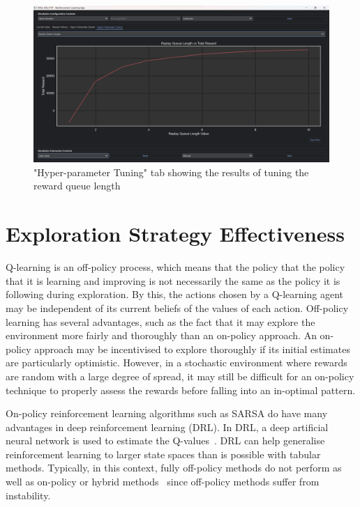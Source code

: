 \documentclass[]{final_report}
\begin{document}
\begin{figure}[H]
  \centering
  
  \includegraphics[trim={0 0 0 6mm},clip,width=\textwidth]{ui-screenshots/hyper-tuning.png}
  
  \caption{\label{fig:screenshot:current-state} "Hyper-parameter Tuning" tab showing the results of tuning the reward queue length}
\end{figure}


\chapter{Exploration Strategy Effectiveness}
\label{chap:exploration-strategy-effectiveness}
Q-learning is an off-policy process, which means that the policy that the policy that it is learning and improving is not necessarily the same as the policy it is following during exploration. By this, the actions chosen by a Q-learning agent may be independent of its current beliefs of the values of each action. Off-policy learning has several advantages, such as the fact that it may explore the environment more fairly and thoroughly than an on-policy approach. An on-policy approach may be incentivised to explore thoroughly if its initial estimates are particularly optimistic. However, in a stochastic environment where rewards are random with a large degree of spread, it may still be difficult for an on-policy technique to properly assess the rewards before falling into an in-optimal pattern.  

On-policy reinforcement learning algorithms such as SARSA do have many advantages in deep reinforcement learning (DRL). In DRL, a deep artificial neural network is used to estimate the Q-values~\cite{deepRLOverview}. DRL can help generalise reinforcement learning to larger state spaces than is possible with tabular methods. Typically, in this context, fully off-policy methods do not perform as well as on-policy or hybrid methods~\cite{deepOnVsOffPolicy} since off-policy methods suffer from instability\cite{sutton2018reinforcement}.
\end{document}
